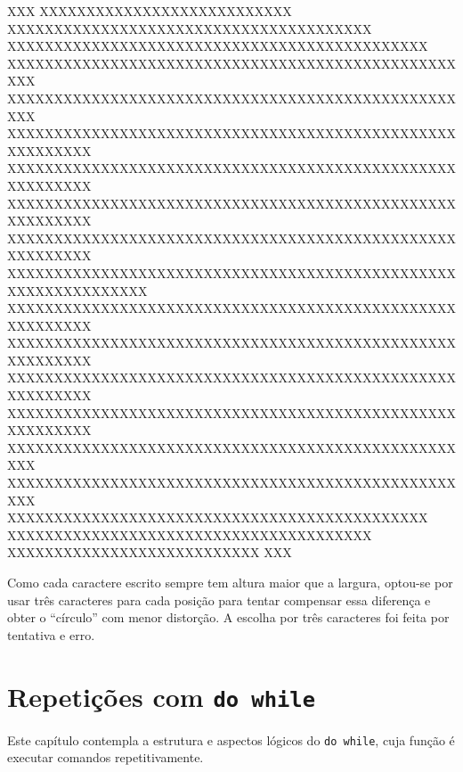 \documentclass[
  11pt,
  a4paper,
]{scrbook}
\newenvironment{Shaded}{\begin{snugshade}}{\end{snugshade}}
\newcommand{\NormalTok}[1]{#1}
\begin{document}
\begin{Shaded}
\begin{Highlighting}[]
\NormalTok{                              XXX                              }
\NormalTok{                  XXXXXXXXXXXXXXXXXXXXXXXXXXX                  }
\NormalTok{            XXXXXXXXXXXXXXXXXXXXXXXXXXXXXXXXXXXXXXX            }
\NormalTok{         XXXXXXXXXXXXXXXXXXXXXXXXXXXXXXXXXXXXXXXXXXXXX         }
\NormalTok{      XXXXXXXXXXXXXXXXXXXXXXXXXXXXXXXXXXXXXXXXXXXXXXXXXXX      }
\NormalTok{      XXXXXXXXXXXXXXXXXXXXXXXXXXXXXXXXXXXXXXXXXXXXXXXXXXX      }
\NormalTok{   XXXXXXXXXXXXXXXXXXXXXXXXXXXXXXXXXXXXXXXXXXXXXXXXXXXXXXXXX   }
\NormalTok{   XXXXXXXXXXXXXXXXXXXXXXXXXXXXXXXXXXXXXXXXXXXXXXXXXXXXXXXXX   }
\NormalTok{   XXXXXXXXXXXXXXXXXXXXXXXXXXXXXXXXXXXXXXXXXXXXXXXXXXXXXXXXX   }
\NormalTok{   XXXXXXXXXXXXXXXXXXXXXXXXXXXXXXXXXXXXXXXXXXXXXXXXXXXXXXXXX   }
\NormalTok{XXXXXXXXXXXXXXXXXXXXXXXXXXXXXXXXXXXXXXXXXXXXXXXXXXXXXXXXXXXXXXX}
\NormalTok{   XXXXXXXXXXXXXXXXXXXXXXXXXXXXXXXXXXXXXXXXXXXXXXXXXXXXXXXXX   }
\NormalTok{   XXXXXXXXXXXXXXXXXXXXXXXXXXXXXXXXXXXXXXXXXXXXXXXXXXXXXXXXX   }
\NormalTok{   XXXXXXXXXXXXXXXXXXXXXXXXXXXXXXXXXXXXXXXXXXXXXXXXXXXXXXXXX   }
\NormalTok{   XXXXXXXXXXXXXXXXXXXXXXXXXXXXXXXXXXXXXXXXXXXXXXXXXXXXXXXXX   }
\NormalTok{      XXXXXXXXXXXXXXXXXXXXXXXXXXXXXXXXXXXXXXXXXXXXXXXXXXX      }
\NormalTok{      XXXXXXXXXXXXXXXXXXXXXXXXXXXXXXXXXXXXXXXXXXXXXXXXXXX      }
\NormalTok{         XXXXXXXXXXXXXXXXXXXXXXXXXXXXXXXXXXXXXXXXXXXXX         }
\NormalTok{            XXXXXXXXXXXXXXXXXXXXXXXXXXXXXXXXXXXXXXX            }
\NormalTok{                  XXXXXXXXXXXXXXXXXXXXXXXXXXX                  }
\NormalTok{                              XXX                              }
\end{Highlighting}
\end{Shaded}

Como cada caractere escrito sempre tem altura maior que a largura,
optou-se por usar três caracteres para cada posição para tentar
compensar essa diferença e obter o ``círculo'' com menor distorção. A
escolha por três caracteres foi feita por tentativa e erro.

\chapter{\texorpdfstring{Repetições com
\texttt{do\ while}}{Repetições com do while}}\label{sec-repeticoes-com-do-while}

Este capítulo contempla a estrutura e aspectos lógicos do
\texttt{do\ while}, cuja função é executar comandos repetitivamente.
\end{document}
